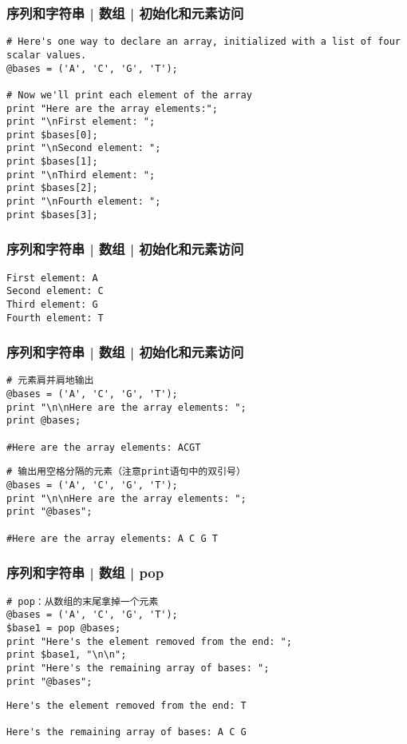 \begin{frame}[fragile]
  \frametitle{序列和字符串 | 数组 | \alert{初始化和元素访问}}
\begin{lstlisting}
# Here's one way to declare an array, initialized with a list of four scalar values.
@bases = ('A', 'C', 'G', 'T');

# Now we'll print each element of the array
print "Here are the array elements:";
print "\nFirst element: ";
print $bases[0];
print "\nSecond element: ";
print $bases[1];
print "\nThird element: ";
print $bases[2];
print "\nFourth element: ";
print $bases[3];
\end{lstlisting}
\end{frame}

\begin{frame}[fragile]
  \frametitle{序列和字符串 | 数组 | 初始化和元素访问}
\begin{lstlisting}
First element: A
Second element: C
Third element: G
Fourth element: T
\end{lstlisting}
\end{frame}

\begin{frame}[fragile]
  \frametitle{序列和字符串 | 数组 | \alert{初始化和元素访问}}
\begin{lstlisting}
# 元素肩并肩地输出
@bases = ('A', 'C', 'G', 'T');
print "\n\nHere are the array elements: ";
print @bases;

#Here are the array elements: ACGT
\end{lstlisting}
\pause
\begin{lstlisting}
# 输出用空格分隔的元素（注意print语句中的双引号）
@bases = ('A', 'C', 'G', 'T');
print "\n\nHere are the array elements: ";
print "@bases";

#Here are the array elements: A C G T
\end{lstlisting}
\end{frame}

\begin{frame}[fragile]
  \frametitle{序列和字符串 | 数组 | \alert{pop}}
\begin{lstlisting}
# pop：从数组的末尾拿掉一个元素
@bases = ('A', 'C', 'G', 'T');
$base1 = pop @bases;
print "Here's the element removed from the end: ";
print $base1, "\n\n";
print "Here's the remaining array of bases: ";
print "@bases";
\end{lstlisting}
\pause
\begin{lstlisting}
Here's the element removed from the end: T

Here's the remaining array of bases: A C G
\end{lstlisting}
\end{frame}

